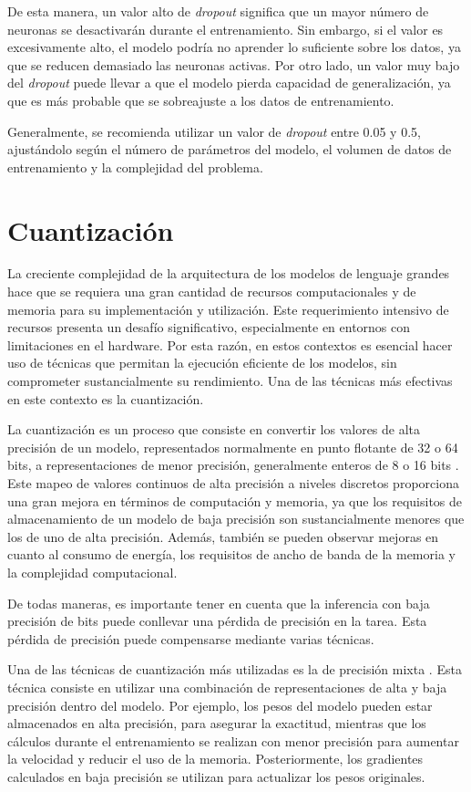 \documentclass[11pt,spanish,listoffigures,listoftables]{tfgetsinf}
\begin{document}
De esta manera, un valor alto de \textit{dropout} significa que un mayor número de neuronas se desactivarán durante el entrenamiento. Sin embargo, si el valor es excesivamente alto, el modelo podría no aprender lo suficiente sobre los datos, ya que se reducen demasiado las neuronas activas. Por otro lado, un valor muy bajo del \textit{dropout} puede llevar a que el modelo pierda capacidad de generalización, ya que es más probable que se sobreajuste a los datos de entrenamiento.

Generalmente, se recomienda utilizar un valor de \textit{dropout} entre 0.05 y 0.5, ajustándolo según el número de parámetros del modelo, el volumen de datos de entrenamiento y la complejidad del problema.

\section{Cuantización}

La creciente complejidad de la arquitectura de los modelos de lenguaje grandes hace que se requiera una gran cantidad de recursos computacionales y de memoria para su implementación y utilización. Este requerimiento intensivo de recursos presenta un desafío significativo, especialmente en entornos con limitaciones en el hardware. Por esta razón, en estos contextos es esencial hacer uso de técnicas que permitan la ejecución eficiente de los modelos, sin comprometer sustancialmente su rendimiento. Una de las técnicas más efectivas en este contexto es la cuantización.

La cuantización es un proceso que consiste en convertir los valores de alta  precisión de un modelo, representados normalmente en punto flotante de 32 o 64 bits, a representaciones de menor precisión, generalmente enteros de 8 o 16 bits \cite{choukroun2019low}. Este mapeo de valores continuos de alta precisión a niveles discretos proporciona una gran mejora en términos de computación y memoria, ya que los requisitos de almacenamiento de un modelo de baja precisión son sustancialmente menores que los de uno de alta precisión. Además, también se pueden observar mejoras en cuanto al consumo de energía, los requisitos de ancho de banda de la memoria y la complejidad computacional.

De todas maneras, es importante tener en cuenta que la inferencia con baja precisión de bits puede conllevar una pérdida de precisión en la tarea. Esta pérdida de precisión puede compensarse mediante varias técnicas.

Una de las técnicas de cuantización más utilizadas es la de precisión mixta \cite{micikevicius2018mixedprecisiontraining}. Esta técnica consiste en utilizar una combinación de representaciones de alta y baja precisión dentro del modelo. Por ejemplo, los pesos del modelo pueden estar almacenados en alta precisión, para asegurar la exactitud, mientras que los cálculos durante el entrenamiento se realizan con menor precisión para aumentar la velocidad y reducir el uso de la memoria. Posteriormente, los gradientes calculados en baja precisión se utilizan para actualizar los pesos originales.
\end{document}
